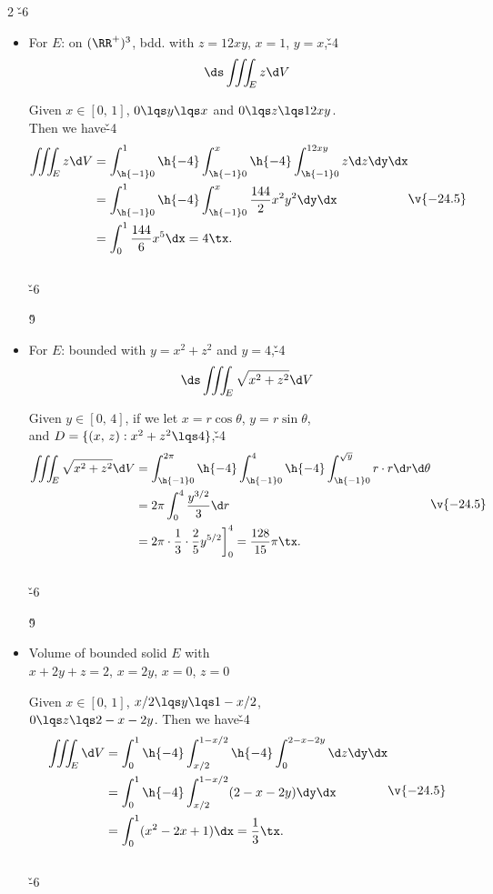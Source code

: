 \documentclass[dvipdfmx,a4paper,titlepage,9pt]{jsarticle}
\begin{document}
\begin{multicols*}{2}
\v{-6}
\begin{itemize}[label={-}]
\item For $E$: on $(\RR^+)^3$, bdd. with $z=12xy$, $x=1$, $y=x$,\v{-4}
$$\ds\iiint_{\!E}z\d V$$

\begin{solbox}
\rnc{\qedsymbol}{}
Given $x\in[0,\,1]$, $0\lqs y\lqs x$ and $0\lqs z\lqs 12xy$.\\
Then we have\v{-4}
$$\begin{aligned}
\iiint_{\!E}z\d V&=\int_{\h{-1}0}^1\h{-4}\int_{\h{-1}0}^x\h{-4}\int_{\h{-1}0}^{12xy}z\d z\dy\dx\\
&=\int_{\h{-1}0}^1\h{-4}\int_{\h{-1}0}^x\frac{144}2x^2y^2\dy\dx\\
&=\int_0^1\frac{144}6x^5\dx=4\tx.
\end{aligned}\v{-24.5}$$
\hfill\Bsq\\
\v{-6}
\end{solbox}\v9

\item For $E$: bounded with $y=x^2+z^2$ and $y=4$,\v{-4}
$$\ds\iiint_{\!E}\sqrt{x^2+z^2}\d V$$

\begin{solbox}
\rnc{\qedsymbol}{}
Given $y\in[0,\,4]$, if we let $x=r\cos\theta$, $y=r\sin\theta$,\\
and $D=\{(x,\,z):x^2+z^2\lqs4\}$,\v{-4}
$$\begin{aligned}
\iiint_{\!E}\sqrt{x^2+z^2}\d V&=\int_{\h{-1}0}^{2\pi}\h{-4}\int_{\h{-1}0}^4\h{-4}\int_{\h{-1}0}^{\sqrt y}r\cdot r\d r\d\theta\\
&=2\pi\int_0^4\frac{y^{3/2}}3\d r\\
&=2\pi\cdot\frac13\cdot\frac25y^{5/2}\bigg]^4_0=\frac{128}{15}\pi\tx.
\end{aligned}\v{-24.5}$$
\hfill\Bsq\\
\v{-6}
\end{solbox}\v9

\item Volume of bounded solid $E$ with\\
$x+2y+z=2$, $x=2y$, $x=0$, $z=0$

\begin{solbox}
\rnc{\qedsymbol}{}
Given $x\in[0,\,1]$, $x/2\lqs y\lqs 1-x/2$,\\
$0\lqs z\lqs 2-x-2y$. Then we have\v{-4}
$$\begin{aligned}
\iiint_{\!E}\d V&=\int_0^1\h{-4}\int_{x/2}^{1-x/2}\h{-4}\int_0^{2-x-2y}\d z\dy\dx\\
&=\int_0^1\h{-4}\int_{x/2}^{1-x/2}(2-x-2y)\dy\dx\\
&=\int_0^1(x^2-2x+1)\dx=\frac13\tx.
\end{aligned}\v{-24.5}$$
\hfill\Bsq\\
\v{-6}
\end{solbox}
\end{itemize}


\end{multicols*}
\end{document}
